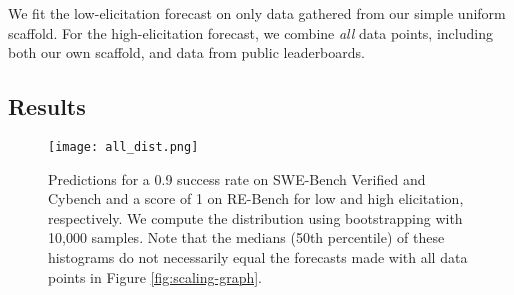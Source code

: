 We fit the low-elicitation forecast on only data gathered from our simple uniform scaffold. For the high-elicitation forecast, we combine \emph{all} data points, including both our own scaffold, and data from public leaderboards.  





\subsection{Results}

\begin{figure*}[!htb]
    \centering
    \texttt{[image: all\_dist.png]}
    \vskip -0.1in
    \caption{
        Predictions for a 0.9 success rate on SWE-Bench Verified and Cybench and a score of 1 on RE-Bench for low and high elicitation, respectively. We compute the distribution using bootstrapping with 10,000 samples.
        Note that the medians (50th percentile) of these histograms do not necessarily equal the forecasts made with all data points in Figure \ref{fig:scaling-graph}.
    }
    \label{fig:distributions}
\end{figure*}





